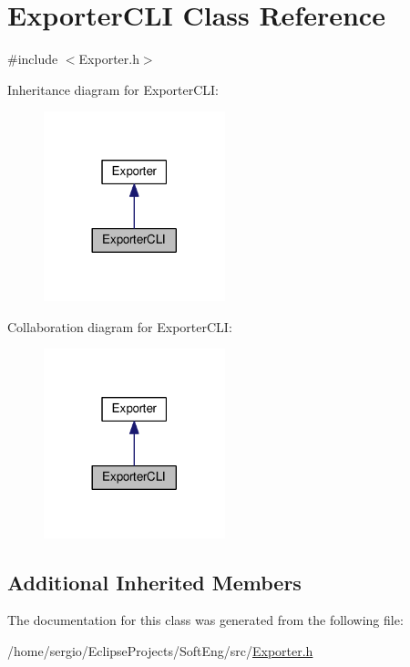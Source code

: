 \hypertarget{class_exporter_c_l_i}{}\section{Exporter\+C\+LI Class Reference}
\label{class_exporter_c_l_i}


{\ttfamily \#include $<$Exporter.\+h$>$}



Inheritance diagram for Exporter\+C\+LI\+:\nopagebreak
\begin{figure}[H]
\begin{center}
\leavevmode
\includegraphics[width=149pt]{class_exporter_c_l_i__inherit__graph}
\end{center}
\end{figure}


Collaboration diagram for Exporter\+C\+LI\+:\nopagebreak
\begin{figure}[H]
\begin{center}
\leavevmode
\includegraphics[width=149pt]{class_exporter_c_l_i__coll__graph}
\end{center}
\end{figure}
\subsection*{Additional Inherited Members}


The documentation for this class was generated from the following file\+:\begin{DoxyCompactItemize}
\item 
/home/sergio/\+Eclipse\+Projects/\+Soft\+Eng/src/\hyperlink{_exporter_8h}{Exporter.\+h}\end{DoxyCompactItemize}
